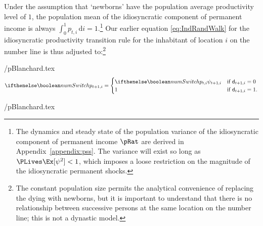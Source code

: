 \documentclass[titlepage]{\econtex}\newcommand{\texname}{cAndCwithStickyE}
\begin{document}
Under the assumption that `newborns' have the population average productivity level of $1$, the population mean of the idiosyncratic component of permanent income is always $\int_{0}^{1} {p}_{t,i}\,\text{d}i = 1$.\footnote{The dynamics and steady state of the population variance of the idiosyncratic component of permanent income $\pRat$ are derived in Appendix~\ref{appendix:pss}.  The variance will exist so long as $\PLives \Ex[\psi^{2}] < 1$, which imposes a loose restriction on the magnitude of the idiosyncratic permanent shocks.}  Our earlier equation \eqref{eq:IndRandWalk} for the idiosyncratic productivity transition rule for the inhabitant of location $i$ on the number line is thus adjusted to:\footnote{The constant population size permits the analytical convenience of replacing the dying with newborns, but it is important to understand that there is no relationship between successive persons at the same location on the number line; this is not a dynastic model.}
\begin{verbatimwrite}{\eq/pBlanchard.tex}
\begin{equation*} \ifnumSw
{p}_{t+1,i} =
  \begin{cases}
    \ifnumSw  {p}_{t,i} \psi_{t+1,i} & \text{if } \pDies_{t+1,i} = 0 \\
    1 & \text{if } \pDies_{t+1,i} = 1. \\
  \end{cases}
\end{equation*}
\end{verbatimwrite}
 \eq/pBlanchard.tex
\end{document}
